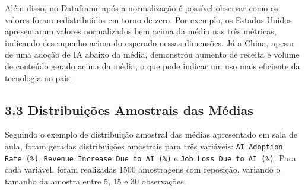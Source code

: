 \documentclass[12pt]{article}
\begin{document}
\begin{itemize}
    Além disso, no Dataframe após a normalização é possível observar como os valores foram redistribuídos em torno de zero. Por exemplo, os Estados Unidos apresentaram valores normalizados bem acima da média nas três métricas, indicando desempenho acima do esperado nessas dimensões. Já a China, apesar de uma adoção de IA abaixo da média, demonstrou aumento de receita e volume de conteúdo gerado acima da média, o que pode indicar um uso mais eficiente da tecnologia no país.
    
\end{itemize}

\subsection*{3.3 Distribuições Amostrais das Médias}

Seguindo o exemplo de distribuição amostral das médias apresentado em sala de aula, foram geradas distribuições amostrais para três variáveis: \texttt{AI Adoption Rate (\%)}, \texttt{Revenue Increase Due to AI (\%)} e \texttt{Job Loss Due to AI (\%)}. Para cada variável, foram realizadas 1500 amostragens com reposição, variando o tamanho da amostra entre 5, 15 e 30 observações.
\end{document}
